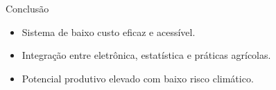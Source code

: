 \documentclass{beamer}
\begin{document}

\begin{frame}{Conclusão}
\begin{itemize}
    \item Sistema de baixo custo eficaz e acessível.
    \item Integração entre eletrônica, estatística e práticas agrícolas.
    \item Potencial produtivo elevado com baixo risco climático.
\end{itemize}
\end{frame}
\end{document}

